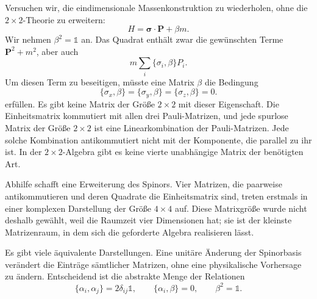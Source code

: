 Versuchen wir, die eindimensionale Massenkonstruktion zu wiederholen, ohne die \(2\times2\)-Theorie zu erweitern:
\begin{equation}
H=\boldsymbol{\sigma}\cdot\mathbf P+\beta m.
\label{eq:l10-failed-mass}
\end{equation}
Wir nehmen \(\beta^2=\mathbb{1}\) an. Das Quadrat enthält zwar die gewünschten Terme \(\mathbf P^2+m^2\), aber auch
\begin{equation}
m\sum_i\{\sigma_i,\beta\}P_i.
\end{equation}
Um diesen Term zu beseitigen, müsste eine Matrix \(\beta\) die Bedingung
\begin{equation}
\{\sigma_x,\beta\}
=
\{\sigma_y,\beta\}
=
\{\sigma_z,\beta\}
=0.
\label{eq:l10-impossible-beta}
\end{equation}
erfüllen. Es gibt keine Matrix der Größe \(2\times2\) mit dieser Eigenschaft. Die Einheitsmatrix kommutiert mit allen drei Pauli-Matrizen, und jede spurlose Matrix der Größe \(2\times2\) ist eine Linearkombination der Pauli-Matrizen. Jede solche Kombination antikommutiert nicht mit der Komponente, die parallel zu ihr ist. In der \(2\times2\)-Algebra gibt es keine vierte unabhängige Matrix der benötigten Art.

Abhilfe schafft eine Erweiterung des Spinors. Vier Matrizen, die paarweise antikommutieren und deren Quadrate die Einheitsmatrix sind, treten erstmals in einer komplexen Darstellung der Größe \(4\times4\) auf. Diese Matrixgröße wurde nicht deshalb gewählt, weil die Raumzeit vier Dimensionen hat; sie ist der kleinste Matrizenraum, in dem sich die geforderte Algebra realisieren lässt.

Es gibt viele äquivalente Darstellungen. Eine unitäre Änderung der Spinorbasis verändert die Einträge sämtlicher Matrizen, ohne eine physikalische Vorhersage zu ändern. Entscheidend ist die abstrakte Menge der Relationen
\begin{equation}
\{\alpha_i,\alpha_j\}=2\delta_{ij}\mathbb{1},
\qquad
\{\alpha_i,\beta\}=0,
\qquad
\beta^2=\mathbb{1}.
\label{eq:l10-dirac-algebra}
\end{equation}

\begin{classroomqa}
\end{classroomqa}

